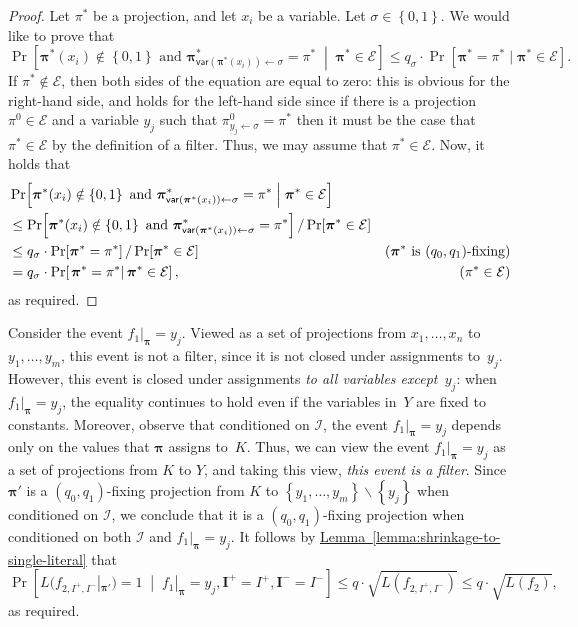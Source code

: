 \documentclass[11pt]{article}
\numberwithin{equation}{section}
\theoremstyle{definition}
\theoremstyle{plain}
\newcommand{\expref}[2]{\hyperref[#2]{#1~\ref{#2}}}
\theoremstyle{definition}\newtheorem{notation}[theorem]{Notation}\theoremstyle{plain}
\newcommand{\B}{\left\{ 0,1 \right \}}
\newcommand{\p}{\boldsymbol{\pi}}
\newcommand{\cE}{\mathcal{E}}
\newcommand{\cI}{\mathcal{I}}
\newcommand{\bI}{\boldsymbol{I}}
\newcommand{\var}{\mathsf{var}}
\theoremstyle{definition}
\theoremstyle{plain}
\begin{document}
\begin{proof}
Let $\pi^{*}$ be a projection, and let $x_{i}$ be a variable. Let
$\sigma\in\B$. We would like to prove that 
\[
\Pr\!\left[\p^{*}(x_{i})\notin\B\text{ and }\p_{\var(\p^{*}(x_{i}))\gets\sigma}^{*}=\pi^{*}\;\middle|\;\p^{*}\in\cE\right]\le q_{\sigma}\cdot\Pr\!\left[\p^{*}=\pi^{*}\mid\p^{*}\in\cE\right].
\]
If $\pi^{*}\notin\cE$, then both sides of the equation are equal
to zero: this is obvious for the right-hand side, and holds for the
left-hand side since if there is a projection~$\pi^{0}\in\cE$ and
a variable $y_{j}$ such that $\pi_{y_{j}\gets\sigma}^{0}=\pi^{*}$
then it must be the case that $\pi^{*}\in\cE$ by the definition of
a filter. Thus, we may assume that $\pi^{*}\in\cE$. Now, it holds
that 
\begin{align*}
 & \Pr\!\left[\p^{*}(x_{i})\notin\B\text{ and }\p_{\var(\p^{*}(x_{i}))\gets\sigma}^{*}=\pi^{*}\;\middle|\;\p^{*}\in\cE\right]\\
 & \le\Pr\!\left[\p^{*}(x_{i})\notin\B\text{ and }\p_{\var(\p^{*}(x_{i}))\gets\sigma}^{*}=\pi^{*}\right]/\Pr\!\left[\p^{*}\in\cE\right]\\
 & \le q_{\sigma}\cdot\Pr\!\left[\p^{*}=\pi^{*}\right]/\Pr\!\left[\p^{*}\in\cE\right] & \text{(\ensuremath{\p^{*}} is \ensuremath{(q_{0},q_{1})}-fixing)}\\
 & =q_{\sigma}\cdot\Pr\!\left[\left.\p^{*}=\pi^{*}\right|\p^{*}\in\cE\right], & \text{(\ensuremath{\pi^{*}\in\cE})}
\end{align*}
as required. 
\end{proof}
Consider the event $f_{1}|_{\p}=y_{j}$. Viewed as a set of projections
from $x_{1},\ldots,x_{n}$ to $y_{1},\ldots,y_{m}$, this event is
not a filter, since it is not closed under assignments to~$y_{j}$.
However, this event is closed under assignments \emph{to all variables
except~$y_{j}$}: when $f_{1}|_{\p}=y_{j}$, the equality continues
to hold even if the variables in~$Y$ are fixed to constants. Moreover,
observe that conditioned on $\cI$, the event $f_{1}|_{\p}=y_{j}$
depends only on the values that $\p$ assigns to~$K$. Thus, we can
view the event $f_{1}|_{\p}=y_{j}$ as a set of projections from $K$
to $Y$, and taking this view, \emph{this event is a filter}. Since
$\p'$ is a $(q_{0},q_{1})$-fixing projection from $K$ to $\left\{ y_{1},\ldots,y_{m}\right\} \backslash\left\{ y_{j}\right\} $
when conditioned on $\cI$, we conclude that it is a $(q_{0},q_{1})$-fixing
projection when conditioned on both $\cI$ and $f_{1}|_{\p}=y_{j}$.
It follows by \expref{Lemma}{lemma:shrinkage-to-single-literal} that 
\[
\Pr\!\left[L(f_{2,I^{+},I^{-}}|_{\p'})=1\;\middle|\;f_{1}|_{\p}=y_{j},\bI^{+}=I^{+},\bI^{-}=I^{-}\right]\le q\cdot\sqrt{L(f_{2,I^{+},I^{-}})}\le q\cdot\sqrt{L(f_{2})},
\]
as required.
\end{document}

